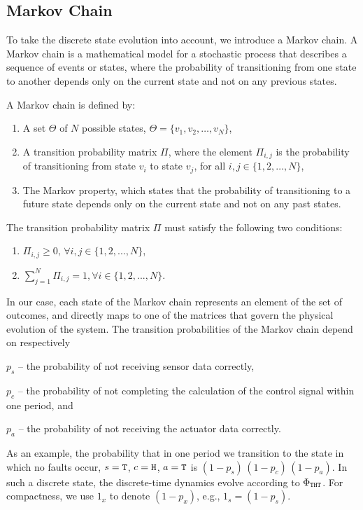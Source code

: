 \subsection{Markov Chain}%
\label{sec:mc}%

To take the discrete state evolution into account, we introduce a Markov chain.
A Markov chain is a mathematical model for a stochastic process that describes a sequence of events or states, where the probability of transitioning from one state to another depends only on the current state and not on any previous states.

\begin{definition}
    A Markov chain is defined by:
    \begin{enumerate}[label=(\roman*)]
        \item A set $\Theta$ of $N$ possible states, $\Theta = \{ v_1, v_2, \dots, v_N \}$,
        \item A transition probability matrix $\Pi$, where the element $\Pi_{i, j}$ is the probability of transitioning from state $v_i$ to state $v_j$, for all $i,j \in \{ 1,2, \dots ,N \}$,
        \item The Markov property, which states that the probability of transitioning to a future state depends only on the current state and not on any past states.
    \end{enumerate}
    The transition probability matrix $\Pi$ must satisfy the following two conditions:
    \begin{enumerate}[label=(\roman*)]
        \itemsep1pt
        \item $\Pi_{i, j} \geq 0, \, \forall i,j \in \{1,2,...,N\}$,
        \item $\sum^{N}_{j=1} \Pi_{i, j} = 1, \forall i \in \{1,2,...,N\}$.
    \end{enumerate}
\end{definition}

In our case, each state of the Markov chain represents an element of the set of outcomes, and directly maps to one of the matrices that govern the physical evolution of the system.
The transition probabilities of the Markov chain depend on respectively
\begin{enumerate*}[label=(\roman*)]
    \item $p_s$ -- the probability of not receiving sensor data correctly,
    \item $p_c$ -- the probability of not completing the calculation of the control signal within one period, and
    \item $p_a$ -- the probability of not receiving the actuator data correctly.
\end{enumerate*}
As an example, the probability that in one period we transition to the state in which no faults occur, $s=\texttt{T}$, $c=\texttt{H}$, $a=\texttt{T}$ is $(1-p_s)\,(1-p_c)\,(1-p_a)$.
In such a discrete state, the discrete-time dynamics evolve according to $\Phi_{\texttt{T}\texttt{H}\texttt{T}}$.
For compactness, we use $1_x$ to denote $(1-p_x)$, e.g., $1_s = (1-p_s)$.

